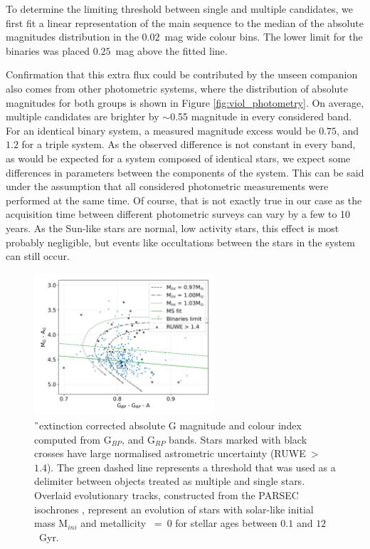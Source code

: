 To determine the limiting threshold between single and multiple candidates, we first fit a linear representation of the main sequence to the median of the absolute magnitudes distribution in the $0.02$~mag wide colour bins. The lower limit for the binaries was placed $0.25$~mag above the fitted line.

Confirmation that this extra flux could be contributed by the unseen companion also comes from other photometric systems, where the distribution of absolute magnitudes for both groups is shown in Figure \ref{fig:viol_photometry}. On average, multiple candidates are brighter by $\sim$0.55 magnitude in every considered band. For an identical binary system, a measured magnitude excess would be $0.75$, and $1.2$ for a triple system. As the observed difference is not constant in every band, as would be expected for a system composed of identical stars, we expect some differences in parameters between the components of the system. This can be said under the assumption that all considered photometric measurements were performed at the same time. Of course, that is not exactly true in our case as the acquisition time between different photometric surveys can vary by a few to 10 years. As the Sun-like stars are normal, low activity stars, this effect is most probably negligible, but events like occultations between the stars in the system can still occur. 

\begin{figure}
	\centering
	\includegraphics[width=0.6\textwidth]{mag_hr_gaia_bin-multi_evol_mh000_nores_ebv_c3_07.png}
	\caption{\G\ extinction corrected absolute G magnitude and colour index computed from G$_{BP}$, and G$_{RP}$ bands. Stars marked with black crosses have large normalised astrometric uncertainty (RUWE~>~$1.4$). The green dashed line represents a threshold that was used as a delimiter between objects treated as multiple and single stars. Overlaid evolutionary tracks, constructed from the PARSEC isochrones \cite{2017ApJ...835...77M}, represent an evolution of stars with solar-like initial mass M$_{ini}$ and metallicity \Mh~=~0 for stellar ages between $0.1$ and $12$~Gyr.}
	\label{fig:gabs_colour}
\end{figure}

